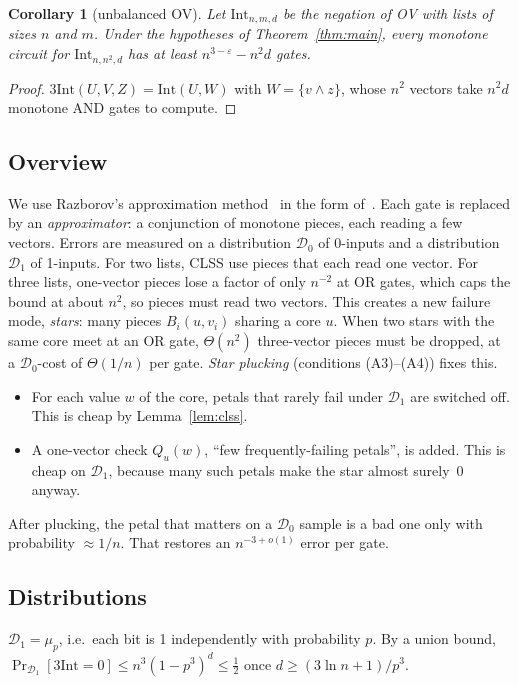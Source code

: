 \documentclass[11pt,a4paper]{article}
\theoremstyle{plain}
\newtheorem{corollary}[theorem]{Corollary}
\theoremstyle{definition}
\theoremstyle{remark}
\newcommand{\Int}{\mathrm{Int}}
\newcommand{\tInt}{3\mathrm{Int}}
\newcommand{\Dz}{\mathcal{D}_0}
\newcommand{\Do}{\mathcal{D}_1}
\begin{document}
\begin{corollary}[unbalanced OV]\label{cor:unbalanced}
Let $\Int_{n,m,d}$ be the negation of OV with lists of sizes $n$ and $m$. Under the hypotheses of
Theorem~\ref{thm:main}, every monotone circuit for $\Int_{n,n^2,d}$ has at least $n^{3-\varepsilon}-n^2d$ gates.
\end{corollary}
\begin{proof}
$\tInt(U,V,Z)=\Int(U,W)$ with $W=\{v\wedge z\}$, whose $n^2$ vectors take $n^2d$ monotone AND gates to compute.
\end{proof}

\subsection{Overview}
We use Razborov's approximation method~\cite{Raz85,AB87} in the form of~\cite{CLSS26}. Each gate is replaced by an
\emph{approximator}: a conjunction of monotone pieces, each reading a few vectors. Errors are measured on a
distribution $\Dz$ of 0-inputs and a distribution $\Do$ of 1-inputs. For two lists, CLSS use pieces that each read
one vector. For three lists, one-vector pieces lose a factor of only $n^{-2}$ at OR gates, which caps the bound at
about $n^2$, so pieces must read two vectors. This creates a new failure mode, \emph{stars}: many pieces $B_i(u,v_i)$
sharing a core $u$. When two stars with the same core meet at an OR gate, $\Theta(n^2)$ three-vector pieces must be
dropped, at a $\Dz$-cost of $\Theta(1/n)$ per gate. \emph{Star plucking} (conditions (A3)--(A4)) fixes this.
\begin{itemize}
  \item For each value $w$ of the core, petals that rarely fail under $\Do$ are switched off. This is cheap by
    Lemma~\ref{lem:clss}.
  \item A one-vector check $Q_u(w)$, ``few frequently-failing petals'', is added. This is cheap on $\Do$, because
    many such petals make the star almost surely~0 anyway.
\end{itemize}
After plucking, the petal that matters on a $\Dz$ sample is a bad one only with probability $\approx1/n$. That restores
an $n^{-3+o(1)}$ error per gate.

\subsection{Distributions}
$\Do=\mu_p$, i.e.\ each bit is 1 independently with probability $p$. By a union bound,
$\Pr_{\Do}[\tInt=0]\le n^3(1-p^3)^d\le\frac12$ once $d\ge(3\ln n+1)/p^3$.
\end{document}
